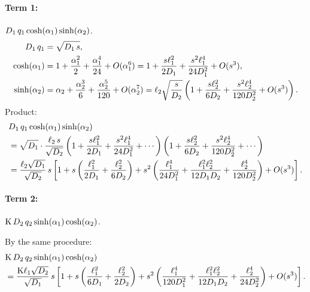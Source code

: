 \paragraph{Term 1:} $D_{1}\,q_1\cosh(\alpha_1)\sinh(\alpha_2)$.
\begin{align}
  D_{1}\,q_1 &= \sqrt{D_{1}\,s},\\
  \cosh(\alpha_1) &= 1 + \frac{\alpha_1^2}{2} + \frac{\alpha_1^4}{24}
    + O(\alpha_1^6)
    = 1 + \frac{s\ell_{1}^2}{2D_{1}} + \frac{s^2\ell_{1}^4}{24D_{1}^2}
    + O(s^3),\\
  \sinh(\alpha_2) &= \alpha_2 + \frac{\alpha_2^3}{6}
    + \frac{\alpha_2^5}{120} + O(\alpha_2^7)
    = \ell_{2}\sqrt{\frac{s}{D_{2}}}
    \left(1 + \frac{s\ell_{2}^2}{6D_{2}}
    + \frac{s^2\ell_{2}^4}{120D_{2}^2} + O(s^3)\right).
\end{align}
Product:
\begin{align}
  &D_{1}\,q_1\cosh(\alpha_1)\sinh(\alpha_2)
  \notag\\
  &= \sqrt{D_{1}}\cdot\frac{\ell_{2}\,s}{\sqrt{D_{2}}}
    \left(1 + \frac{s\ell_{1}^2}{2D_{1}} + \frac{s^2\ell_{1}^4}{24D_{1}^2}
    + \cdots\right)
    \left(1 + \frac{s\ell_{2}^2}{6D_{2}}
    + \frac{s^2\ell_{2}^4}{120D_{2}^2} + \cdots\right)
  \notag\\
  &= \frac{\ell_{2}\sqrt{D_{1}}}{\sqrt{D_{2}}}\,s
    \left[1 + s\left(\frac{\ell_{1}^2}{2D_{1}} + \frac{\ell_{2}^2}{6D_{2}}
    \right)
    + s^2\left(\frac{\ell_{1}^4}{24D_{1}^2}
    + \frac{\ell_{1}^2\ell_{2}^2}{12D_{1}D_{2}}
    + \frac{\ell_{2}^4}{120D_{2}^2}\right) + O(s^3)\right].
  \label{eq:term1-expanded}
\end{align}

\paragraph{Term 2:} $\mathrm{K}\,D_{2}\,q_2\sinh(\alpha_1)\cosh(\alpha_2)$.

By the same procedure:
\begin{align}
  &\mathrm{K}\,D_{2}\,q_2\sinh(\alpha_1)\cosh(\alpha_2)
  \notag\\
  &= \frac{\mathrm{K}\ell_{1}\sqrt{D_{2}}}{\sqrt{D_{1}}}\,s
    \left[1 + s\left(\frac{\ell_{1}^2}{6D_{1}} + \frac{\ell_{2}^2}{2D_{2}}
    \right)
    + s^2\left(\frac{\ell_{1}^4}{120D_{1}^2}
    + \frac{\ell_{1}^2\ell_{2}^2}{12D_{1}D_{2}}
    + \frac{\ell_{2}^4}{24D_{2}^2}\right) + O(s^3)\right].
  \label{eq:term2-expanded}
\end{align}

